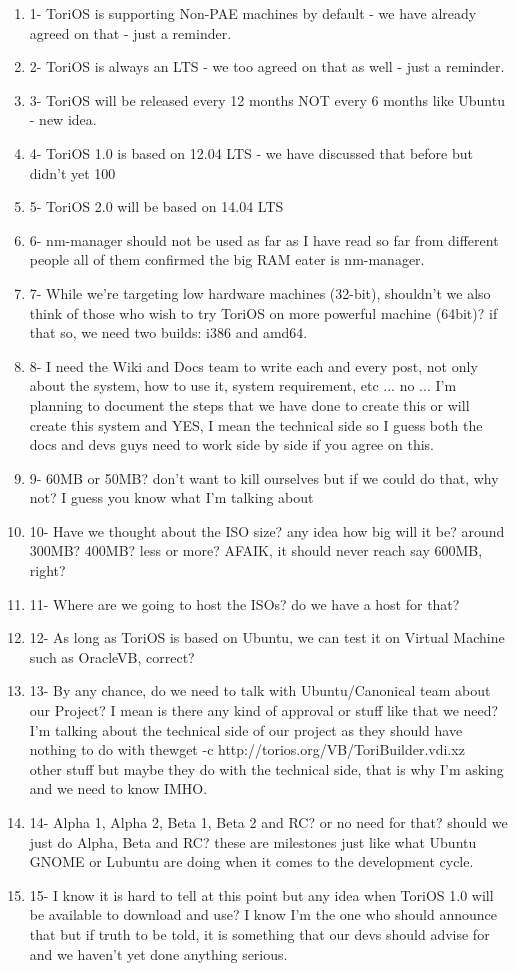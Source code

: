 \documentclass[12pt,a4paper]{book}
\begin{document}
\begin{enumerate}
\item 1- ToriOS is supporting Non-PAE machines by default - we have already agreed on that - just a reminder.
\item 2- ToriOS is always an LTS - we too agreed on that as well - just a reminder.
\item3- ToriOS will be released every 12 months NOT every 6 months like Ubuntu - new idea.
\item4- ToriOS 1.0 is based on 12.04 LTS - we have discussed that before but didn't yet 100%
\item5- ToriOS 2.0 will be based on 14.04 LTS
\item6- nm-manager should not be used as far as I have read so far from different people all of them confirmed the big RAM eater is nm-manager.
\item7- While we're targeting low hardware machines (32-bit), shouldn't we also think of those who wish to try ToriOS on more powerful machine (64bit)? if that so, we need two builds: i386 and amd64.
\item8- I need the Wiki and Docs team to write each and every post, not only about the system, how to use it, system requirement, etc ... no ... I'm planning to document the steps that we have done to create this or will create this system and YES, I mean the technical side so I guess both the docs and devs guys need to work side by side if you agree on this.
\item9- 60MB or 50MB? don't want to kill ourselves but if we could do that, why not? I guess you know what I'm talking about
\item 10- Have we thought about the ISO size? any idea how big will it be? around 300MB? 400MB? less or more? AFAIK, it should never reach say 600MB, right?
\item 11- Where are we going to host the ISOs? do we have a host for that?
\item 12- As long as ToriOS is based on Ubuntu, we can test it on Virtual Machine such as OracleVB, correct?
\item 13- By any chance, do we need to talk with Ubuntu/Canonical team about our Project? I mean is there any kind of approval or stuff like that we need? I'm talking about the technical side of our project as they should have nothing to do with thewget -c http://torios.org/VB/ToriBuilder.vdi.xz \\ other stuff but maybe they do with the technical side, that is why I'm asking and we need to know IMHO.
\item 14- Alpha 1, Alpha 2, Beta 1, Beta 2 and RC? or no need for that? should we just do Alpha, Beta and RC? these are milestones just like what Ubuntu GNOME or Lubuntu are doing when it comes to the development cycle.
\item 15- I know it is hard to tell at this point but any idea when ToriOS 1.0 will be available to download and use? I know I'm the one who should announce that but if truth to be told, it is something that our devs should advise for and we haven't yet done anything serious. 
\end{enumerate}
\end{document}

